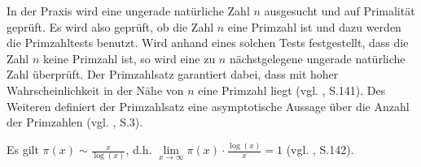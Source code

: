 In der Praxis wird eine ungerade natürliche Zahl $n$
ausgesucht und auf Primalität geprüft. Es wird also geprüft,
ob die Zahl $n$ eine Primzahl ist und dazu werden die
Primzahltests benutzt. Wird anhand eines solchen Tests
festgestellt, dass die Zahl $n$ keine Primzahl ist, so
wird eine zu $n$ nächstgelegene ungerade natürliche Zahl
überprüft. Der Primzahlsatz garantiert dabei, dass mit
hoher Wahrscheinlichkeit in der Nähe von $n$ eine Primzahl
liegt (vgl. \cite{karpfingerkiechle}, S.141).
Des Weiteren definiert der Primzahlsatz eine asymptotische
Aussage über die Anzahl der Primzahlen (vgl. \cite{schuerz}, S.3).

\begin{theorem}[Primzahlsatz]
Es gilt \( \pi (x) \sim \frac{x}{\log(x)}\), d.h.
\( \lim\limits_{x\to\infty} \pi(x)\cdot \frac{\log(x)}{x} = 1 \)
(vgl. \cite{karpfingerkiechle}, S.142).
\end{theorem}

